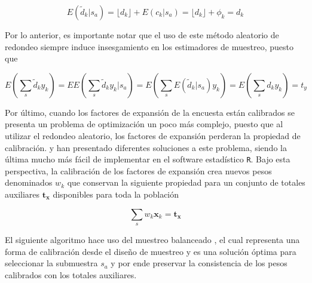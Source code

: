 \documentclass[
  10pt,
  spanish,
]{book}
\begin{document}
\[
E(\tilde d_k | s_a) 
= \lfloor d_k \rfloor + E(c_k|s_a) 
= \lfloor d_k \rfloor + \phi_k
= d_k
\]

Por lo anterior, es importante notar que el uso de este método aleatorio de redondeo siempre induce insesgamiento en los estimadores de muestreo, puesto que

\[
E \left( \sum_s \tilde d_k y_k \right) 
= E E \left( \sum_s \tilde d_k y_k  | s_a\right) 
= E \left( \sum_s E(\tilde d_k | s_a) y_k \right) 
= E \left( \sum_s d_k y_k \right) = t_y
\]

Por último, cuando los factores de expansión de la encuesta están calibrados se presenta un problema de optimización un poco más complejo, puesto que al utilizar el redondeo aleatorio, los factores de expansión perderan la propiedad de calibración. \citet{Sartore_Toppin_Young_Spiegelman_2019} y \citet{Tille} han presentado diferentes soluciones a este problema, siendo la última mucho más fácil de implementar en el software estadístico \texttt{R}. Bajo esta perspectiva, la calibración de los factores de expansión crea nuevos pesos denominados \(w_k\) que conservan la siguiente propiedad para un conjunto de totales auxiliares \(\mathbf{t_x}\) disponibles para toda la población

\[
\sum_s w_k \mathbf{x}_k =  \mathbf{t_x}
\]

El siguiente algoritmo hace uso del muestreo balanceado \citep[capítulo 8]{Tille_2006}, el cual representa una forma de calibración desde el diseño de muestreo y es una solución óptima para seleccionar la submuestra \(s_a\) y por ende preservar la consistencia de los pesos calibrados con los totales auxiliares.

\begin{algorithm}
\DontPrintSemicolon
{}
\;
\end{algorithm}
\end{document}

